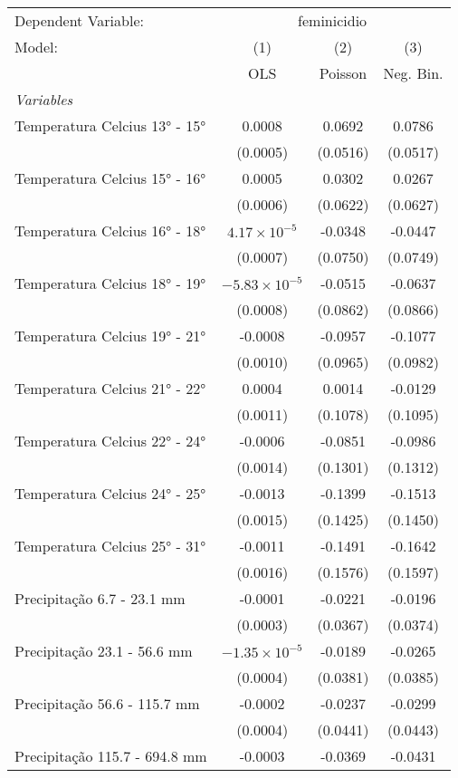 \documentclass[
]{article}
\begin{document}
\begin{tabular}{lccc}
\tabularnewline\midrule\midrule
Dependent Variable:&\multicolumn{3}{c}{feminicidio}\\
Model:&(1) & (2) & (3)\\
 &  OLS & Poisson & Neg. Bin.\\
\midrule \emph{Variables}&   &   &  \\
Temperatura Celcius 13° - 15° & 0.0008 & 0.0692 & 0.0786\\
  &(0.0005) & (0.0516) & (0.0517)\\
Temperatura Celcius 15° - 16° & 0.0005 & 0.0302 & 0.0267\\
  &(0.0006) & (0.0622) & (0.0627)\\
Temperatura Celcius 16° - 18° & $4.17\times 10^{-5}$ & -0.0348 & -0.0447\\
  &(0.0007) & (0.0750) & (0.0749)\\
Temperatura Celcius 18° - 19° & $-5.83\times 10^{-5}$ & -0.0515 & -0.0637\\
  &(0.0008) & (0.0862) & (0.0866)\\
Temperatura Celcius 19° - 21° & -0.0008 & -0.0957 & -0.1077\\
  &(0.0010) & (0.0965) & (0.0982)\\
Temperatura Celcius 21° - 22° & 0.0004 & 0.0014 & -0.0129\\
  &(0.0011) & (0.1078) & (0.1095)\\
Temperatura Celcius 22° - 24° & -0.0006 & -0.0851 & -0.0986\\
  &(0.0014) & (0.1301) & (0.1312)\\
Temperatura Celcius 24° - 25° & -0.0013 & -0.1399 & -0.1513\\
  &(0.0015) & (0.1425) & (0.1450)\\
Temperatura Celcius 25° - 31° & -0.0011 & -0.1491 & -0.1642\\
  &(0.0016) & (0.1576) & (0.1597)\\
Precipitação 6.7 - 23.1 mm & -0.0001 & -0.0221 & -0.0196\\
  &(0.0003) & (0.0367) & (0.0374)\\
Precipitação 23.1 - 56.6 mm & $-1.35\times 10^{-5}$ & -0.0189 & -0.0265\\
  &(0.0004) & (0.0381) & (0.0385)\\
Precipitação 56.6 - 115.7 mm & -0.0002 & -0.0237 & -0.0299\\
  &(0.0004) & (0.0441) & (0.0443)\\
Precipitação 115.7 - 694.8 mm & -0.0003 & -0.0369 & -0.0431\\

\end{tabular}
\end{document}

